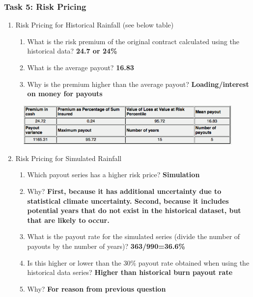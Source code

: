 \documentclass[letterpaper,10pt,english]{sphinxmanual}
\begin{document}
\subsubsection{Task 5: Risk Pricing}
\label{wiiet/wiiet_influenceshortdatasetsanskey:task-5-risk-pricing}\begin{enumerate}
\item {} 
Risk Pricing for Historical Rainfall (see below table)
\begin{enumerate}
\item {} 
What is the risk premium of the original contract calculated using the historical data? \textbf{24.7 or 24\%}

\item {} 
What is the average payout? \textbf{16.83}

\item {} 
Why is the premium higher than the average payout? \textbf{Loading/interest on money for payouts}

\end{enumerate}

\end{enumerate}
\begin{figure}[htbp]
\centering

\includegraphics{premium.png}
\end{figure}
\begin{enumerate}
\setcounter{enumi}{1}
\item {} 
Risk Pricing for Simulated Rainfall
\begin{enumerate}
\item {} 
Which payout series has a higher risk price? \textbf{Simulation}

\item {} 
Why? \textbf{First, because it has additional uncertainty due to statistical climate uncertainty. Second, because it includes potential years that do not exist in the historical dataset, but that are likely to occur.}

\item {} 
What is the payout rate for the simulated series (divide the number of payouts by the number of years)? \textbf{363/990=36.6\%}

\item {} 
Is this higher or lower than the 30\% payout rate obtained when using the historical data series? \textbf{Higher than historical burn payout rate}

\item {} 
Why? \textbf{For reason from previous question}

\end{enumerate}

\end{enumerate}
\end{document}
